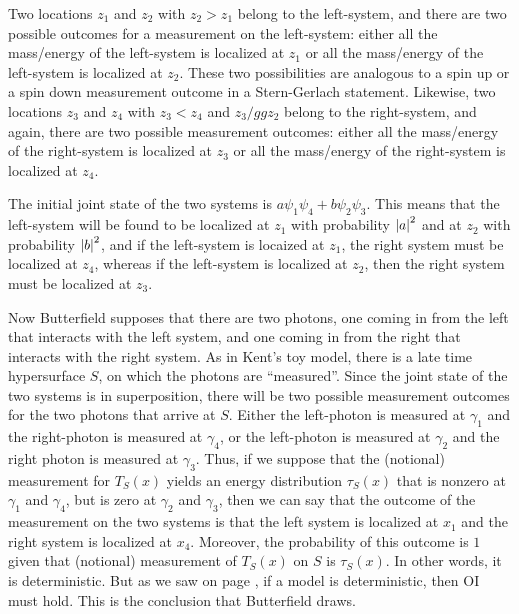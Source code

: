 Two locations $z_1$ and $z_2$ with $z_2>z_1$ belong to the left-system, and there are two possible outcomes for a measurement on the left-system: either all the mass/energy of the left-system is localized at $z_1$ or all the mass/energy of the left-system  is localized at $z_2$. These two possibilities are analogous to a spin up or a spin down measurement outcome in a Stern-Gerlach statement. Likewise, two locations $z_3$ and $z_4$ with $z_3<z_4$ and $z_3/gg z_2$ belong to the right-system, and again, there are two possible measurement outcomes: either all the mass/energy of the right-system is localized at $z_3$ or all the mass/energy of the right-system  is localized at $z_4$.

The initial joint state of the two systems is 
$a \psi_1\psi_4 +b \psi_2\psi_3.$
This means that the left-system will be found to be localized at $z_1$ with probability $\abs{a}^2$ and at $z_2$ with probability $\abs{b}^2$, and if the left-system is locaized at $z_1$, the  right system must be localized at $z_4$, whereas if the left-system is localized at $z_2$, then the right system must be localized at $z_3$.  

Now Butterfield supposes that there are two photons, one coming in from the left that interacts with the left system, and one coming in from the right that interacts with the right system. As in Kent's toy model, there is a late time hypersurface $S$, on which the photons are ``measured''. Since the joint state of the two systems  is in superposition, there will be two possible measurement outcomes for the two photons that arrive at $S$. Either the left-photon is measured at $\gamma_1$ and the right-photon is measured at $\gamma_4$, or the left-photon is measured at $\gamma_2$ and the right photon is measured at $\gamma_3$. Thus, if we suppose that the (notional) measurement for $T_S(x)$ yields an energy distribution $\tau_S(x)$ that is nonzero at $\gamma_1$ and $\gamma_4$, but is zero at $\gamma_2$ and $\gamma_3$, then we can say that the outcome of the measurement on the two systems is that the left system is localized at $x_1$ and the right system is localized at $x_4$. Moreover, the probability of this outcome is $1$ given that (notional) measurement of $T_S(x)$ on $S$ is $\tau_S(x)$. In other words, it is deterministic. But as we saw on page \pageref{OIdet}, if a model is deterministic, then OI must hold. This is the conclusion that Butterfield draws. 

